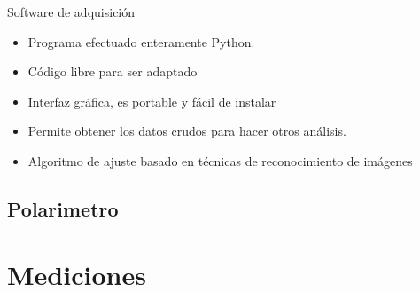 \begin{frame}{Software de adquisición}
    \begin{itemize}
        \item Programa efectuado enteramente Python.
        \item Código libre para ser adaptado
        \item Interfaz gráfica, es portable y fácil de instalar
        \item Permite obtener los datos crudos para hacer otros análisis.
        \item Algoritmo de ajuste basado en técnicas de reconocimiento de imágenes
    \end{itemize}
\end{frame}

\subsection{Polarimetro}


\section{Mediciones}


